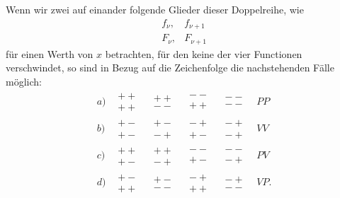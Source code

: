 \documentclass[11pt]{article}
\begin{document}
Wenn wir zwei auf einander folgende Glieder dieser Doppelreihe, wie
\[
\begin{matrix}
f_\nu,&f_{\nu+1}\\
F_\nu,&F_{\nu+1}
\end{matrix}
\]
für einen Werth von $x$ betrachten, für den keine der vier Functionen verschwindet, so sind in Bezug auf die Zeichenfolge die nachstehenden Fälle möglich:
\[
\begin{array}{c|cccc|c}
a)&\begin{matrix}++\\++\end{matrix}&
  \begin{matrix}++\\--\end{matrix}&
  \begin{matrix}--\\++\end{matrix}&
  \begin{matrix}--\\--\end{matrix}&PP\\[0.7em]
b)&\begin{matrix}+-\\+-\end{matrix}&
  \begin{matrix}+-\\-+\end{matrix}&
  \begin{matrix}-+\\+-\end{matrix}&
  \begin{matrix}-+\\-+\end{matrix}&VV\\[0.7em]
c)&\begin{matrix}++\\+-\end{matrix}&
  \begin{matrix}++\\-+\end{matrix}&
  \begin{matrix}--\\+-\end{matrix}&
  \begin{matrix}--\\-+\end{matrix}&PV\\[0.7em]
d)&\begin{matrix}+-\\++\end{matrix}&
  \begin{matrix}+-\\--\end{matrix}&
  \begin{matrix}-+\\++\end{matrix}&
  \begin{matrix}-+\\--\end{matrix}&VP.
\end{array}
\]
\end{document}
